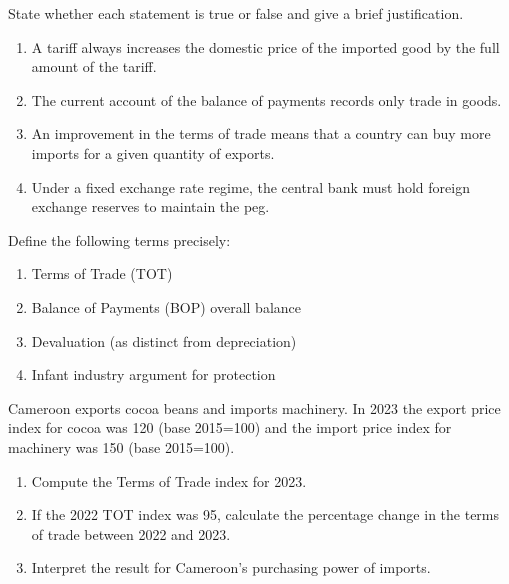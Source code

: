 \documentclass[11pt]{article}
\newcounter{popsec}
\newcounter{popsub}
\newcommand{\courssub}[1]{%
  \stepcounter{popsub}%
  \par\vspace{9pt}\noindent{\popxbold\fontsize{11.5}{13}\selectfont\color{popink}{\color{poporange}\thepopsec.\thepopsub}\hspace{6pt}#1}\par\nopagebreak\vspace{4pt}
}
\begin{document}
\begin{exercice}
State whether each statement is true or false and give a brief justification.
\begin{enumerate}
\item A tariff always increases the domestic price of the imported good by the full amount of the tariff.
\item The current account of the balance of payments records only trade in goods.
\item An improvement in the terms of trade means that a country can buy more imports for a given quantity of exports.
\item Under a fixed exchange rate regime, the central bank must hold foreign exchange reserves to maintain the peg.
\end{enumerate}
\end{exercice}

\begin{exercice}[Definitions]
Define the following terms precisely:
\begin{enumerate}
\item Terms of Trade (TOT)
\item Balance of Payments (BOP) overall balance
\item Devaluation (as distinct from depreciation)
\item Infant industry argument for protection
\end{enumerate}
\end{exercice}

\begin{exercice}
Cameroon exports cocoa beans and imports machinery. In 2023 the export price index for cocoa was 120 (base 2015=100) and the import price index for machinery was 150 (base 2015=100).
\begin{enumerate}
\item Compute the Terms of Trade index for 2023.
\item If the 2022 TOT index was 95, calculate the percentage change in the terms of trade between 2022 and 2023.
\item Interpret the result for Cameroon's purchasing power of imports.
\end{enumerate}
\end{exercice}

\courssub{I practise}
\end{document}
